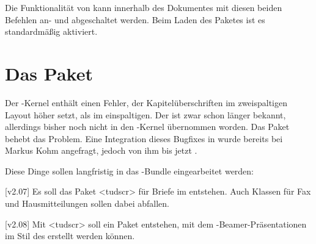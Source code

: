 \begin{Bundle*}{}
%
\begin{Declaration}[v2.02]{}
\begin{Declaration}[v2.02]{}
\printdeclarationlist%
%
Die Funktionalität von  kann innerhalb des Dokumentes mit 
diesen beiden Befehlen an- und abgeschaltet werden. Beim Laden des Paketes ist 
es standardmäßig aktiviert.
\end{Declaration}
\end{Declaration}
%
%
\end{Bundle*}



\section{Das Paket }
\begin{Bundle*}{}
%
%
Der -Kernel enthält einen Fehler, der Kapitelüberschriften im
zweispaltigen Layout höher setzt, als im einspaltigen. Der 
ist zwar schon länger bekannt, allerdings bisher noch nicht in den 
-Kernel übernommen worden. Das Paket  behebt 
das Problem. Eine Integration dieses Bugfixes in \KOMAScript{} wurde bereits 
bei Markus Kohm angefragt, jedoch von ihm bis jetzt 
.
\end{Bundle*}


Diese Dinge sollen langfristig in das \TUDScript-Bundle eingearbeitet werden:

[v2.07]
Es soll das Paket <tudscr> für Briefe im \TUDCD 
entstehen. Auch Klassen für Fax und Hausmitteilungen sollen dabei abfallen.

[v2.08]
Mit <tudscr> soll ein Paket entstehen, mit dem 
-Beamer-Präsentationen im Stil des \TUDCDs erstellt werden können.

